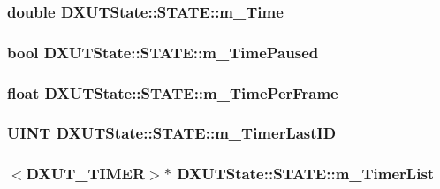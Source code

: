\label{struct_d_x_u_t_state_1_1_s_t_a_t_e_aa4b70ae5dbeca009b9a185e49ba9bdee}
\hypertarget{struct_d_x_u_t_state_1_1_s_t_a_t_e_ac76dfb119b4397d41056aa6a5392cb89}{
\subsubsection[{m\_\-Time}]{\setlength{\rightskip}{0pt plus 5cm}double {\bf DXUTState::STATE::m\_\-Time}}}
\label{struct_d_x_u_t_state_1_1_s_t_a_t_e_ac76dfb119b4397d41056aa6a5392cb89}
\hypertarget{struct_d_x_u_t_state_1_1_s_t_a_t_e_aa22d41686445da99b82a46a5f49bfae4}{
\subsubsection[{m\_\-TimePaused}]{\setlength{\rightskip}{0pt plus 5cm}bool {\bf DXUTState::STATE::m\_\-TimePaused}}}
\label{struct_d_x_u_t_state_1_1_s_t_a_t_e_aa22d41686445da99b82a46a5f49bfae4}
\hypertarget{struct_d_x_u_t_state_1_1_s_t_a_t_e_a88cc5ed3a6c278d8878729cb31807d38}{
\subsubsection[{m\_\-TimePerFrame}]{\setlength{\rightskip}{0pt plus 5cm}float {\bf DXUTState::STATE::m\_\-TimePerFrame}}}
\label{struct_d_x_u_t_state_1_1_s_t_a_t_e_a88cc5ed3a6c278d8878729cb31807d38}
\hypertarget{struct_d_x_u_t_state_1_1_s_t_a_t_e_a4ac1c84ee64b88305935da70d01fb1af}{
\subsubsection[{m\_\-TimerLastID}]{\setlength{\rightskip}{0pt plus 5cm}UINT {\bf DXUTState::STATE::m\_\-TimerLastID}}}
\label{struct_d_x_u_t_state_1_1_s_t_a_t_e_a4ac1c84ee64b88305935da70d01fb1af}
\hypertarget{struct_d_x_u_t_state_1_1_s_t_a_t_e_a044d4d33534c19e0fdb1d4f69185679f}{
\subsubsection[{m\_\-TimerList}]{$<${\bf DXUT\_\-TIMER}$>$$\ast$ {\bf DXUTState::STATE::m\_\-TimerList}}}
